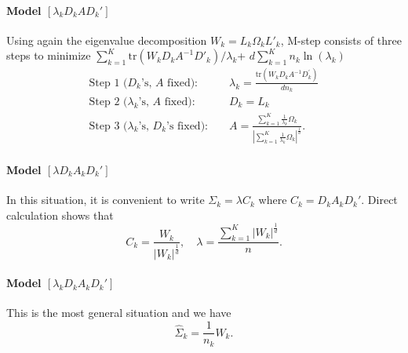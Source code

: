 \documentclass[12pt]{article}
\begin{document}
\paragraph{Model $[\lambda_k D_k A D_{k}']$}
Using again the eigenvalue decomposition $W_{k}=L_{k}\Omega_{k}L'_{k}$, M-step consists of
three steps to minimize $\sum_{k=1}^{K} \mbox{tr} ( W_k D_k A^{-1}D'_{k})/\lambda_k$+ \linebreak
$d\sum_{k=1}^{K} n_k \ln(\lambda_k)$
\begin{eqnarray}
  \mbox{Step 1 ($D_k$'s, $A$ fixed): } & & \lambda_k=\frac{\mbox{tr}(W_kD_kA^{-1}D_k^{'})}{dn_{k}} \\
  \mbox{Step 2 ($\lambda_k$'s, $A$ fixed): } & & D_k =  L_k\\
  \mbox{Step 3 ($\lambda_k$'s, $D_k$'s fixed): } & &
  A=\frac{\sum_{k=1}^{K} \frac{1}{\lambda_k}\Omega_k} {
    |\sum_{k=1}^{K}\frac{1}{\lambda_k}\Omega_k|^{\frac{1}{d}}}.
\end{eqnarray}


\paragraph{Model $[\lambda D_k A_k D_{k}']$}
In this situation, it is convenient to write $\Sigma_k=\lambda C_k$ where $C_{k}=D_k A_k
D_{k}'$. Direct calculation shows that
\begin{equation}
C_k=\frac{W_k} { |W_k|^{\frac{1}{d}}} ,\quad \lambda
=\frac{\sum_{k=1}^{K} |W_k|^{\frac{1}{d}}} {n}.
\end{equation}

\paragraph{Model $[\lambda_k D_k A_k D_{k}']$}
This is the most general situation and we have
\begin{equation}
  \hat{\Sigma}_{k}=\frac{1}{n_k}W_k.
\end{equation}
\end{document}
